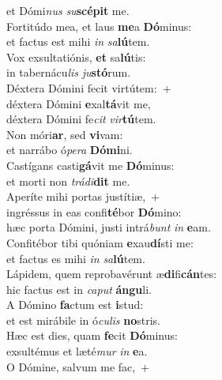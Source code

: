 \oddverse et Dómi\textit{nus} \textit{su}\textbf{scé}\textbf{pit} me.\\
\evenverse Fortitúdo mea, et laus \textbf{me}a \textbf{Dó}minus:~\*\\
\evenverse et factus est mihi \textit{in} \textit{sa}\textbf{lú}tem.\\
\oddverse Vox exsultatiónis, \textbf{et} sa\textbf{lú}tis:~\*\\
\oddverse in tabernácu\textit{lis} \textit{ju}\textbf{stó}rum.\\
\evenverse Déxtera Dómini fecit virtútem:~+\\
\evenverse  déxtera Dómini \textbf{e}xal\textbf{tá}vit me,~\*\\
\evenverse déxtera Dómini fe\textit{cit} \textit{vir}\textbf{tú}tem.\\
\oddverse Non móri\textbf{ar}, sed \textbf{vi}vam:~\*\\
\oddverse et narrábo ó\textit{pe}\textit{ra} \textbf{Dó}\textbf{mi}ni.\\
\evenverse Castígans casti\textbf{gá}vit me \textbf{Dó}minus:~\*\\
\evenverse et morti non \textit{trá}\textit{di}\textbf{dit} me.\\
\oddverse Aperíte mihi portas justítiæ,~+\\
\oddverse  ingréssus in eas confi\textbf{té}bor \textbf{Dó}mino:~\*\\
\oddverse hæc porta Dómini, justi intrá\textit{bunt} \textit{in} \textbf{e}am.\\
\evenverse Confitébor tibi quóniam \textbf{e}xau\textbf{dí}sti me:~\*\\
\evenverse et factus es mihi \textit{in} \textit{sa}\textbf{lú}tem.\\
\oddverse Lápidem, quem reprobavérunt æ\textbf{di}fi\textbf{cán}tes:~\*\\
\oddverse hic factus est in \textit{ca}\textit{put} \textbf{án}\textbf{gu}li.\\
\evenverse A Dómino \textbf{fa}ctum est \textbf{i}stud:~\*\\
\evenverse et est mirábile in ó\textit{cu}\textit{lis} \textbf{no}stris.\\
\oddverse Hæc est dies, quam \textbf{fe}cit \textbf{Dó}minus:~\*\\
\oddverse exsultémus et læté\textit{mur} \textit{in} \textbf{e}a.\\
\evenverse O Dómine, salvum me fac,~+\\
